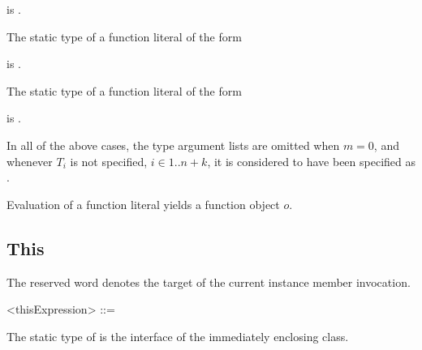 \documentclass[makeidx]{article}
\begin{document}
\noindent
is
.

\LMHash{}%
The static type of a function literal of the form

\noindent
\code{<\TypeParametersStd>}

\noindent
{}

\noindent
is
.

\LMHash{}%
The static type of a function literal of the form

\noindent
\code{<\TypeParametersStd>}

\noindent
{}

\noindent
is
.

\LMHash{}%
In all of the above cases,
the type argument lists are omitted when $m=0$,
and whenever $T_i$ is not specified, $i \in 1 .. n+k$,
it is considered to have been specified as \DYNAMIC{}.

\LMHash{}%
Evaluation of a function literal yields a function object $o$.



\subsection{This}

\LMHash{}%
The reserved word \THIS{} denotes the target of the current instance member invocation.

\begin{grammar}
<thisExpression> ::= \THIS{}
\end{grammar}

\LMHash{}%
The static type of \THIS{} is the interface of the immediately enclosing class.

\end{document}
